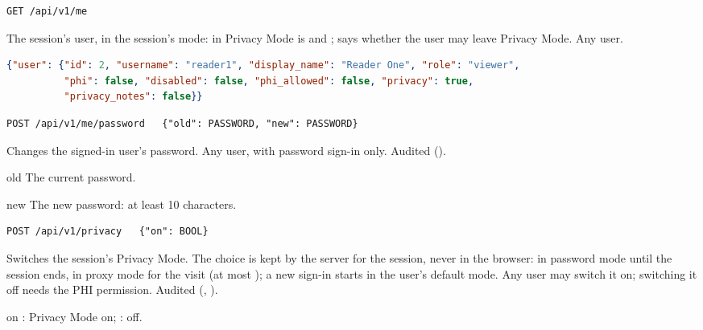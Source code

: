 \begin{lstlisting}[style=signature]
GET /api/v1/me
\end{lstlisting}
The session's user, in the session's mode: in Privacy Mode  is  and
 ;  says whether the user may leave Privacy Mode.
Any user.
\begin{lstlisting}[language=JSON]
{"user": {"id": 2, "username": "reader1", "display_name": "Reader One", "role": "viewer",
          "phi": false, "disabled": false, "phi_allowed": false, "privacy": true,
          "privacy_notes": false}}
\end{lstlisting}

\begin{lstlisting}[style=signature]
POST /api/v1/me/password   {"old": PASSWORD, "new": PASSWORD}
\end{lstlisting}
Changes the signed-in user's password. Any user, with password sign-in only. Audited
().
\begin{params}
\item[old] The current password.
\item[new] The new password: at least 10 characters.
\end{params}

\begin{lstlisting}[style=signature]
POST /api/v1/privacy   {"on": BOOL}
\end{lstlisting}
Switches the session's Privacy Mode. The choice is kept by the server for the session, never
in the browser: in password mode until the session ends, in proxy mode for the visit (at most
); a new sign-in starts in the user's default mode. Any user may switch it
on; switching it off needs the PHI permission. Audited (,
).
\begin{params}
\item[on] : Privacy Mode on; : off.
\end{params}

